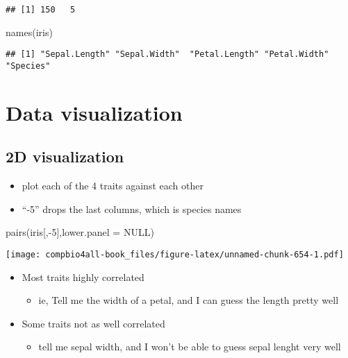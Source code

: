 \documentclass[
]{book}
\newenvironment{Shaded}{\begin{snugshade}}{\end{snugshade}}
\newcommand{\AttributeTok}[1]{\textcolor[rgb]{0.77,0.63,0.00}{#1}}
\newcommand{\ConstantTok}[1]{\textcolor[rgb]{0.00,0.00,0.00}{#1}}
\newcommand{\DecValTok}[1]{\textcolor[rgb]{0.00,0.00,0.81}{#1}}
\newcommand{\FunctionTok}[1]{\textcolor[rgb]{0.00,0.00,0.00}{#1}}
\newcommand{\NormalTok}[1]{#1}
\newcommand{\SpecialCharTok}[1]{\textcolor[rgb]{0.00,0.00,0.00}{#1}}
\providecommand{\tightlist}{%
  \setlength{\itemsep}{0pt}\setlength{\parskip}{0pt}}
\begin{document}
\begin{verbatim}
## [1] 150   5
\end{verbatim}

\begin{Shaded}
\begin{Highlighting}[]
\FunctionTok{names}\NormalTok{(iris)}
\end{Highlighting}
\end{Shaded}

\begin{verbatim}
## [1] "Sepal.Length" "Sepal.Width"  "Petal.Length" "Petal.Width"  "Species"
\end{verbatim}

\hypertarget{data-visualization}{%
\section{Data visualization}\label{data-visualization}}

\hypertarget{d-visualization}{%
\subsection{2D visualization}\label{d-visualization}}

\begin{itemize}
\tightlist
\item
  plot each of the 4 traits against each other
\item
  ``-5'' drops the last columns, which is species names
\end{itemize}

\begin{Shaded}
\begin{Highlighting}[]
\FunctionTok{pairs}\NormalTok{(iris[,}\SpecialCharTok{{-}}\DecValTok{5}\NormalTok{],}\AttributeTok{lower.panel =} \ConstantTok{NULL}\NormalTok{)}
\end{Highlighting}
\end{Shaded}

\texttt{[image: compbio4all-book\_files/figure-latex/unnamed-chunk-654-1.pdf]}

\begin{itemize}
\tightlist
\item
  Most traits highly correlated

  \begin{itemize}
  \tightlist
  \item
    ie, Tell me the width of a petal, and I can guess the length pretty well
  \end{itemize}
\item
  Some traits not as well correlated

  \begin{itemize}
  \tightlist
  \item
    tell me sepal width, and I won't be able to guess sepal lenght very well
  \end{itemize}
\end{itemize}
\end{document}
